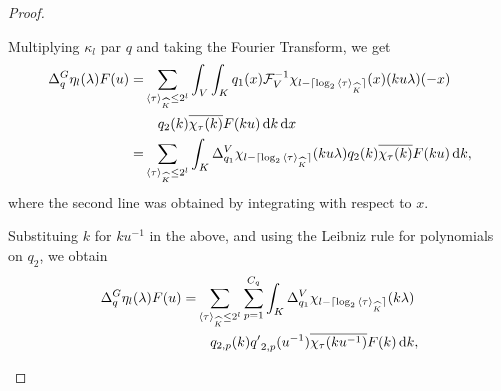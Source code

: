 \begin{proof}
\begin{description}
            Multiplying $\kappa_l$ par $q$ and taking the Fourier Transform, we get
            \begin{align}
                \DifferenceOperator{q} \eta_l (\lambda) F(u)
                = &\sum_{\JapaneseBracket{\CompactGroup}{\tau} \leq 2^l}
                    \int_\VectorSpace
                        \int_\CompactGroup
                            q_1(x) \InverseFourier[\VectorSpace]{\chi_{l - \Ceiling{\log_2 \JapaneseBracket{\CompactGroup}{\tau}}}}(x) (k u \lambda)(-x) \notag\\
                            &\quad q_2(k) \conj{\Character{\tau}(k)} F(k u)
                        \dd k
                    \dd x\notag\\
                = &\sum_{\JapaneseBracket{\CompactGroup}{\tau} \leq 2^l}
                    \int_\CompactGroup
                        \DifferenceOperator[\VectorSpace]{q_1} \chi_{l - \Ceiling{\log_2 \JapaneseBracket{\CompactGroup}{\tau}}}(k u \lambda)
                        q_2(k) \conj{\Character{\tau}(k)} F(k u)
                    \dd k \label{eq:theorem:Littlewood-Paley_decomposition:rho_condition},
            \end{align}
            where the second line was obtained by integrating with respect to $x$.

            Substituing $k$ for $k u^{-1}$ in the above,
            and using the Leibniz rule for polynomials on $q_2$, we obtain
            \begin{align*}
                \DifferenceOperator{q} \eta_l (\lambda) F(u)
                = &\sum_{\JapaneseBracket{\CompactGroup}{\tau} \leq 2^l}
                    \sum_{p = 1}^{C_q}
                        \int_\CompactGroup
                            \DifferenceOperator[\VectorSpace]{q_1} \chi_{l - \Ceiling{\log_2 \JapaneseBracket{\CompactGroup}{\tau}}}(k \lambda)\\
                            &\quad q_{2, p}(k) {q'}_{2, p}(u^{-1}) \conj{\Character{\tau}(k u^{-1})} F(k)
                        \dd k,
            \end{align*}


\end{description}
\end{proof}
